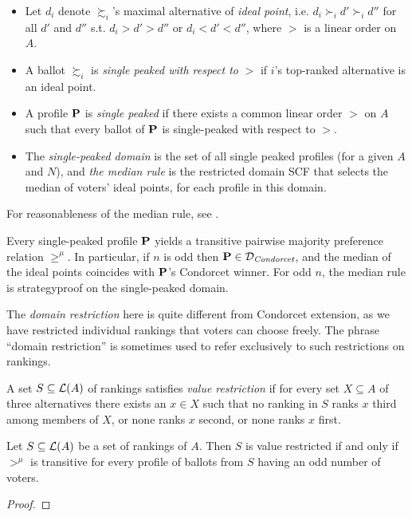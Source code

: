 \begin{definition}
    \begin{itemize}
        \item Let $d_i$ denote $\succsim_i$'s maximal alternative of \emph{ideal point}, i.e. $d_i \succ_i d' \succ_i d''$ for all $d'$ and $d''$ s.t. $d_i > d' >d''$ or $d_i <d'<d''$, where $>$ is a linear order on $A$.
        \item A ballot $\succsim_i$ is \emph{single peaked with respect to} $>$ if $i$'s top-ranked alternative is an ideal point.
        \item A profile $\mathbf{P}$ is \emph{single peaked} if there exists a common linear order $>$ on $A$ such that every ballot of $\mathbf{P}$ is single-peaked with respect to $>$.
        \item The \emph{single-peaked domain} is the set of all single peaked profiles (for a given $A$ and $N$), and \emph{the median rule} is the restricted domain SCF that selects the median of voters' ideal points, for each profile in this domain.
    \end{itemize}
\end{definition}

For reasonableness of the median rule, see \textcite{Black1987}.

\begin{theorem}
    Every single-peaked profile $\mathbf{P}$ yields a transitive pairwise majority preference relation $\geqslant^\mu$. In particular, if $n$ is odd then $\mathbf{P} \in \mathcal{D}_\textit{Condorcet}$, and the median of the ideal points coincides with $\mathbf{P}$'s Condorcet winner. For odd $n$, the median rule is strategyproof on the single-peaked domain.
\end{theorem}

The \emph{domain restriction} here is quite different from Condorcet extension, as we have restricted individual rankings that voters can choose freely. The phrase ``domain restriction'' is sometimes used to refer exclusively to such restrictions on rankings.

\begin{definition}
    A set $S \subseteq \mathcal{L}(A)$ of rankings satisfies \emph{value restriction} if for every set $X \subseteq A$ of three alternatives there exists an $x \in X$ such that no ranking in $S$ ranks $x$ third among members of $X$, or none ranks $x$ second, or none ranks $x$ first.
\end{definition}

\begin{theorem}
    Let $S \subseteq \mathcal{L}(A)$ be a set of rankings of $A$. Then $S$ is value restricted if and only if $>^\mu$ is transitive for every profile of ballots from $S$ having an odd number of voters.
\end{theorem}

\begin{proof}
    
\end{proof}